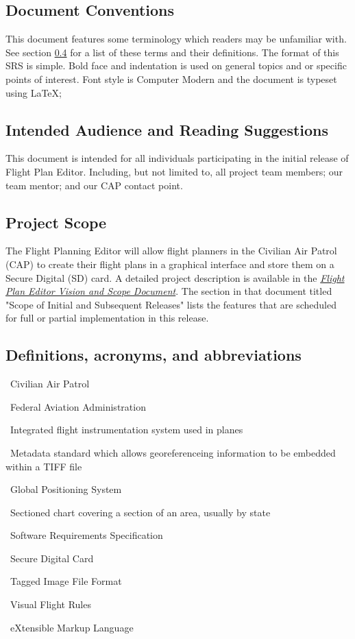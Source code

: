 \documentclass[12pt, letterpaper]{article}
\begin{document}
  \subsection{Document Conventions}
  This document features some terminology which readers may be unfamiliar with.
  See section \hyperref[sec:glossary]{\ref{sec:glossary}} for a list of these terms and their definitions.
  The format of this SRS is simple. Bold face and indentation is used on general topics and or specific points of interest.
  Font style is Computer Modern and the document is typeset using \LaTeX;
  \subsection{Intended Audience and Reading Suggestions}
  This document is intended for all individuals participating in the initial release of Flight Plan Editor.
  Including, but not limited to, all project team members; our team mentor; and our CAP contact point.

  \subsection{Project Scope}
  The Flight Planning Editor will allow flight planners in the Civilian Air Patrol (CAP)
  to create their flight plans in a graphical interface and store them on a Secure Digital (SD) card.
  A detailed project description is available in the \hyperref[sec:ref]{\textit{Flight Plan Editor Vision and Scope Document}}.
  The section in that document titled "Scope of Initial and Subsequent Releases" lists the features that are
  scheduled for full or partial implementation in this release.

  \subsection{Definitions, acronyms, and abbreviations} \label{sec:glossary}
\begin{description}[style=nextline, leftmargin=10mm, topsep=0mm,noitemsep]
      \item[CAP] \hfill \ Civilian Air Patrol
      \item[FAA] \hfill \ Federal Aviation Administration
      \item[Garmin G1000] \hfill \ Integrated flight instrumentation system used in planes
      \item[GeoTIFF] \hfill \ Metadata standard which allows georeferenceing information to be embedded within a TIFF file
      \item[GPS] \hfill \ Global Positioning System
      \item[Sectional] \hfill \ Sectioned chart covering a section of an area, usually by state
      \item[SRS] \hfill \ Software Requirements Specification
      \item[SD Card] \hfill \ Secure Digital Card
      \item[TIFF] \hfill \ Tagged Image File Format
      \item[VFR] \hfill \ Visual Flight Rules
      \item[XML] \hfill \ eXtensible Markup Language
  \end{description}
\end{document}
